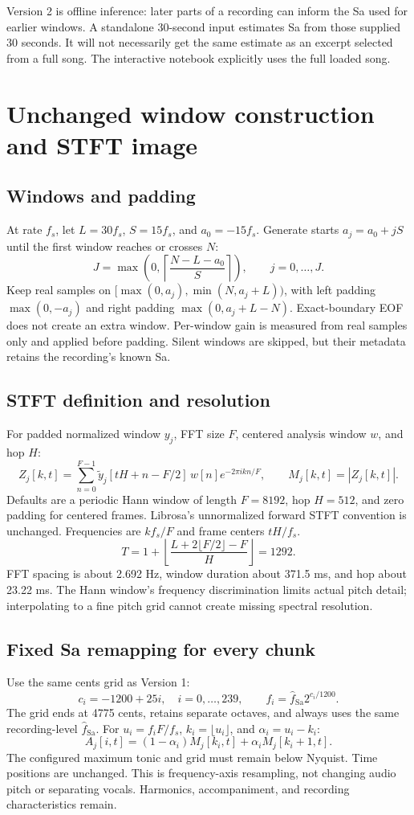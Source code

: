 \documentclass[11pt,a4paper]{article}
\begin{document}
Version 2 is offline inference: later parts of a recording can inform the Sa used
for earlier windows. A standalone 30-second input estimates Sa from those supplied
30 seconds. It will not necessarily get the same estimate as an excerpt selected
from a full song. The interactive notebook explicitly uses the full loaded song.

\section{Unchanged window construction and STFT image}
\subsection{Windows and padding}
At rate $f_s$, let $L=30f_s$, $S=15f_s$, and $a_0=-15f_s$. Generate starts
$a_j=a_0+jS$ until the first window reaches or crosses $N$:
\[
J=\max\left(0,\left\lceil\frac{N-L-a_0}{S}\right\rceil\right),\qquad j=0,\ldots,J.
\]
Keep real samples on $[\max(0,a_j),\min(N,a_j+L))$, with left padding
$\max(0,-a_j)$ and right padding $\max(0,a_j+L-N)$.
Exact-boundary EOF does not create an extra window. Per-window gain is measured
from real samples only and applied before padding. Silent windows are skipped,
but their metadata retains the recording's known Sa.

\subsection{STFT definition and resolution}
For padded normalized window $y_j$, FFT size $F$, centered analysis window $w$,
and hop $H$:
\[
Z_j[k,t]=\sum_{n=0}^{F-1}\widetilde y_j[tH+n-F/2]\,w[n]e^{-2\pi i kn/F},
\qquad M_j[k,t]=|Z_j[k,t]|.
\]
Defaults are a periodic Hann window of length $F=8192$, hop $H=512$, and zero
padding for centered frames. Librosa's unnormalized forward STFT convention is
unchanged. Frequencies are $kf_s/F$ and frame centers $tH/f_s$.
\[
T=1+\left\lfloor\frac{L+2\lfloor F/2\rfloor-F}{H}\right\rfloor=1292.
\]
FFT spacing is about 2.692 Hz, window duration about 371.5 ms, and hop about
23.22 ms. The Hann window's frequency discrimination limits actual pitch detail;
interpolating to a fine pitch grid cannot create missing spectral resolution.

\subsection{Fixed Sa remapping for every chunk}
Use the same cents grid as Version 1:
\[
c_i=-1200+25i,\quad i=0,\ldots,239,\qquad
f_i=\widehat f_{\mathrm{Sa}}2^{c_i/1200}.
\]
The grid ends at 4775 cents, retains separate octaves, and always uses the same
recording-level $\widehat f_{\mathrm{Sa}}$. For $u_i=f_iF/f_s$,
$k_i=\lfloor u_i\rfloor$, and $\alpha_i=u_i-k_i$:
\[
A_j[i,t]=(1-\alpha_i)M_j[k_i,t]+\alpha_iM_j[k_i+1,t].
\]
The configured maximum tonic and grid must remain below Nyquist. Time positions
are unchanged. This is frequency-axis resampling, not changing audio pitch or
separating vocals. Harmonics, accompaniment, and recording characteristics remain.
\end{document}
